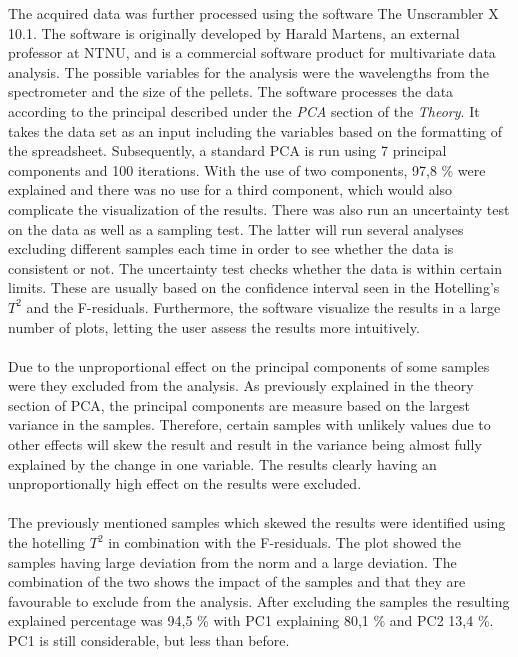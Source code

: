 The acquired data was further processed using the software The Unscrambler X 10.1. The software is originally developed by Harald Martens, an external professor at NTNU, and is a commercial software product for multivariate data analysis. The possible variables for the analysis were the wavelengths from the spectrometer and the size of the pellets. The software processes the data according to the principal described under the \textit{PCA} section of the \textit{Theory}. It takes the data set as an input including the variables based on the formatting of the spreadsheet. Subsequently, a standard PCA is run using 7 principal components and 100 iterations. With the use of two components, 97,8 \% were explained and there was no use for a third component, which would also complicate the visualization of the results. There was also run an uncertainty test on the data as well as a sampling test. The latter will run several analyses excluding different samples each time in order to see whether the data is consistent or not. The uncertainty test checks whether the data is within certain limits. These are usually based on the confidence interval seen in the Hotelling's $T^2$ and the F-residuals. Furthermore, the software visualize the results in a large number of plots, letting the user assess the results more intuitively. 
\\\\
Due to the unproportional effect on the principal components of some samples were they excluded from the analysis. As previously explained in the theory section of PCA, the principal components are measure based on the largest variance in the samples. Therefore, certain samples with unlikely values due to other effects will skew the result and result in the variance being almost fully explained by the change in one variable. The results clearly having an unproportionally high effect on the results were excluded.
\\\\%
The previously mentioned samples which skewed the results were identified using the hotelling $T^2$ in combination with the F-residuals. The plot showed the samples having large deviation from the norm and a large deviation. The combination of the two shows the impact of the samples and that they are favourable to exclude from the analysis. After excluding the samples the resulting explained percentage was 94,5 \% with PC1 explaining 80,1 \% and PC2 13,4 \%. PC1 is still considerable, but less than before.
